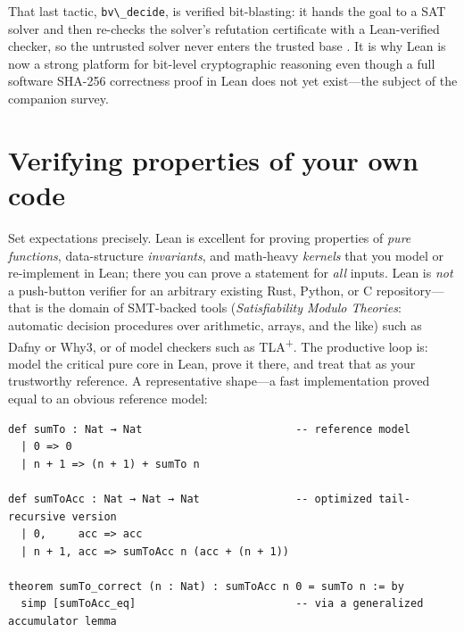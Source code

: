 \documentclass[11pt]{article}
\newcommand{\code}[1]{\lstinline[basicstyle=\ttfamily]|#1|}
\begin{document}
\noindent That last tactic, \code{bv\_decide}, is verified bit-blasting: it hands
the goal to a SAT solver and then re-checks the solver's refutation certificate
with a Lean-verified checker, so the untrusted solver never enters the trusted
base \cite{boving-bvdecide}. It is why Lean is now a strong platform for
bit-level cryptographic reasoning even though a full software SHA-256 correctness
proof in Lean does not yet exist---the subject of the companion survey.

\section{Verifying properties of your own code}\label{sec:verify}
Set expectations precisely. Lean is excellent for proving properties of
\emph{pure functions}, data-structure \emph{invariants}, and math-heavy
\emph{kernels} that you model or re-implement in Lean; there you can prove a
statement for \emph{all} inputs. Lean is \emph{not} a push-button verifier for an
arbitrary existing Rust, Python, or C repository---that is the domain of
SMT-backed tools (\emph{Satisfiability Modulo Theories}: automatic decision
procedures over arithmetic, arrays, and the like) such as Dafny or Why3, or of
model checkers such as TLA\textsuperscript{+}. The productive loop is: model the
critical pure core in Lean, prove it there, and treat that as your trustworthy
reference. A representative shape---a fast implementation proved equal to an
obvious reference model:

\begin{lstlisting}
def sumTo : Nat → Nat                        -- reference model
  | 0 => 0
  | n + 1 => (n + 1) + sumTo n

def sumToAcc : Nat → Nat → Nat               -- optimized tail-recursive version
  | 0,     acc => acc
  | n + 1, acc => sumToAcc n (acc + (n + 1))

theorem sumTo_correct (n : Nat) : sumToAcc n 0 = sumTo n := by
  simp [sumToAcc_eq]                         -- via a generalized accumulator lemma
\end{lstlisting}

\end{document}
